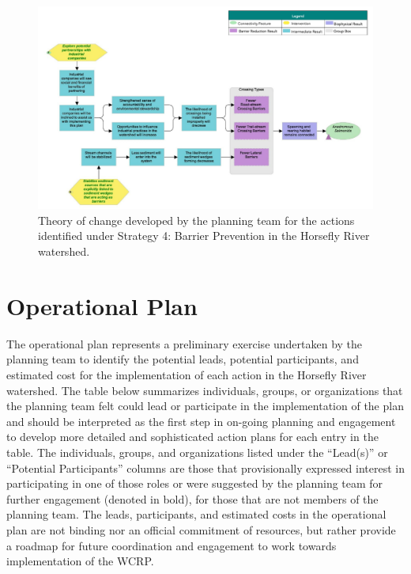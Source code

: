 \documentclass[
  letterpaper,
  DIV=11,
  numbers=noendperiod]{scrreprt}
\begin{document}
\begin{figure}

{\centering \includegraphics{images/figure7.png}

}

\caption{\label{fig-stra4}Theory of change developed by the planning
team for the actions identified under Strategy 4: Barrier Prevention in
the Horsefly River watershed.}

\end{figure}

\hypertarget{operational-plan}{%
\section*{Operational Plan}\label{operational-plan}}


The operational plan represents a preliminary exercise undertaken by the
planning team to identify the potential leads, potential participants,
and estimated cost for the implementation of each action in the Horsefly
River watershed. The table below summarizes individuals, groups, or
organizations that the planning team felt could lead or participate in
the implementation of the plan and should be interpreted as the first
step in on-going planning and engagement to develop more detailed and
sophisticated action plans for each entry in the table. The individuals,
groups, and organizations listed under the ``Lead(s)'' or ``Potential
Participants'' columns are those that provisionally expressed interest
in participating in one of those roles or were suggested by the planning
team for further engagement (denoted in bold), for those that are not
members of the planning team. The leads, participants, and estimated
costs in the operational plan are not binding nor an official commitment
of resources, but rather provide a roadmap for future coordination and
engagement to work towards implementation of the WCRP.
\end{document}
